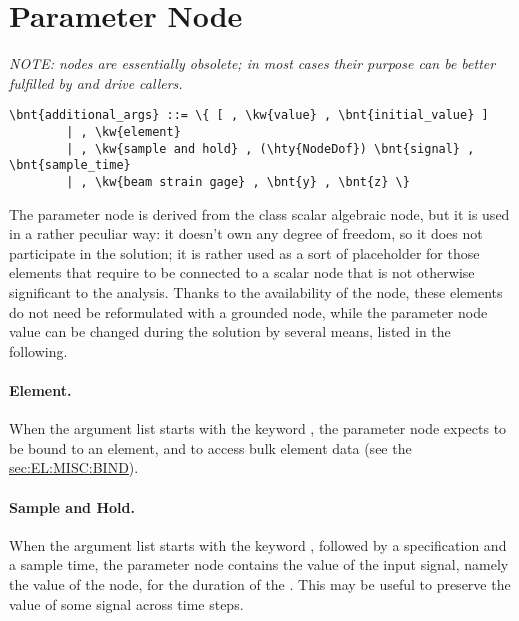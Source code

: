 \section{Parameter Node}
\label{sec:NODE:PARAMETER}

\emph{NOTE:  nodes are essentially obsolete;
in most cases their purpose can be better fulfilled
by  and  drive callers.}

\begin{Verbatim}[commandchars=\\\{\}]
    \bnt{additional_args} ::= \{ [ , \kw{value} , \bnt{initial_value} ]
        | , \kw{element}
        | , \kw{sample and hold} , (\hty{NodeDof}) \bnt{signal} , \bnt{sample_time}
        | , \kw{beam strain gage} , \bnt{y} , \bnt{z} \}
\end{Verbatim}
The parameter node is derived from the class scalar algebraic node, but it
is used in a rather peculiar way: it doesn't own any degree of freedom,
so it does not participate in the solution; it is rather used as a sort of
placeholder for those elements that require to be connected to a scalar node
that is not otherwise significant to the analysis.
Thanks to the availability of the  node, these elements
do not need be reformulated with a grounded node, while the parameter
node value can be changed during the solution by several means,
listed in the following.

\paragraph{Element.}
\label{sec:NODE:PARAMETER:ELEMENT}
When the argument list starts with the keyword , the parameter
node expects to be bound to an element, and to access bulk element data 
(see the \hyperref{\kwnd{bind} statement}{\kw{bind} statement, Section~}{}{sec:EL:MISC:BIND}).

\paragraph{Sample and Hold.}
\label{sec:NODE:PARAMETER:SAH}
When the argument list starts with the keyword ,
followed by a  specification and a sample time,
the parameter node contains the value of the input signal, namely
the value of the node, for the duration of the .
This may be useful to preserve the value of some signal across
time steps.

